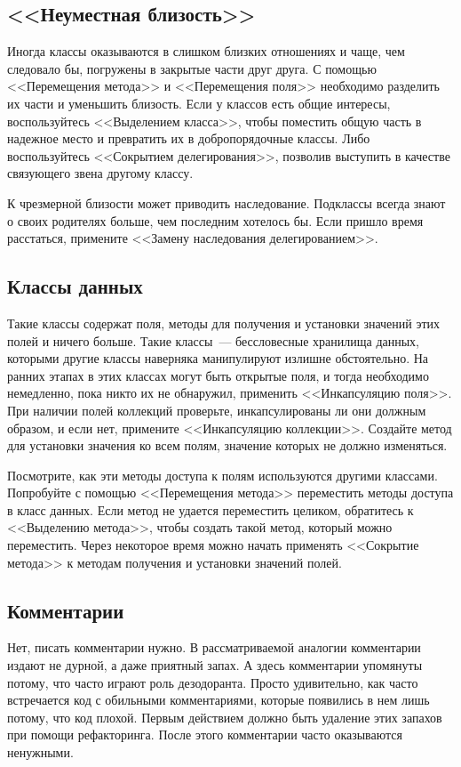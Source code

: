 \documentclass{../../text-style}
\begin{document}
\subsection{<<Неуместная близость>>}

Иногда классы оказываются в слишком близких отношениях и чаще, чем следовало бы, погружены в закрытые части друг друга. С помощью <<Перемещения метода>> и <<Перемещения поля>> необходимо разделить их части и уменьшить близость. Если у классов есть общие интересы, воспользуйтесь <<Выделением класса>>, чтобы поместить общую часть в надежное место и превратить их в добропорядочные классы. Либо воспользуйтесь <<Сокрытием делегирования>>, позволив выступить в качестве связующего звена другому классу.

К чрезмерной близости может приводить наследование. Подклассы всегда знают о своих родителях больше, чем последним хотелось бы. Если пришло время расстаться, примените <<Замену наследования делегированием>>.

\subsection{Классы данных}

Такие классы содержат поля, методы для получения и установки значений этих полей и ничего больше. Такие классы~--- бессловесные хранилища данных, которыми другие классы наверняка манипулируют излишне обстоятельно. На ранних этапах в этих классах могут быть открытые поля, и тогда необходимо немедленно, пока никто их не обнаружил, применить <<Инкапсуляцию поля>>. При наличии полей коллекций проверьте, инкапсулированы ли они должным образом, и если нет, примените <<Инкапсуляцию коллекции>>. Создайте метод для установки значения ко всем полям, значение которых не должно изменяться.

Посмотрите, как эти методы доступа к полям используются другими классами. Попробуйте с помощью <<Перемещения метода>> переместить методы доступа в класс данных. Если метод не удается переместить целиком, обратитесь к <<Выделению метода>>, чтобы создать такой метод, который можно переместить. Через некоторое время можно начать применять <<Сокрытие метода>> к методам получения и установки значений полей.

\subsection{Комментарии}

Нет, писать комментарии нужно. В рассматриваемой аналогии комментарии издают не дурной, а даже приятный запах. А здесь комментарии упомянуты потому, что часто играют роль дезодоранта. Просто удивительно, как часто встречается код с обильными комментариями, которые появились в нем лишь потому, что код плохой. Первым действием должно быть удаление этих запахов при помощи рефакторинга. После этого комментарии часто оказываются ненужными.
\end{document}
